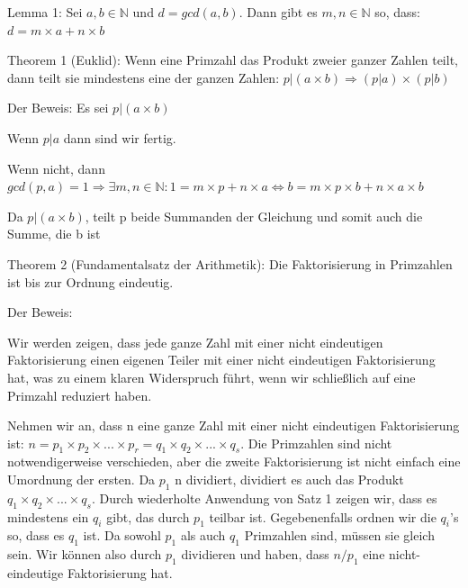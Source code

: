 \documentclass[a4paper]{article}
\begin{document}
\begin{multicols}{3}
\begin{itemize*}
\begin{itemize*}
                  \item Lemma 1: Sei $a,b\in\mathbb{N}$ und $d=gcd(a,b)$. Dann gibt es $m,n\in\mathbb{N}$ so, dass: $d=m\times a+n \times b$
            \end{itemize*}
            \item Theorem 1 (Euklid): Wenn eine Primzahl das Produkt zweier ganzer
            Zahlen teilt, dann teilt sie mindestens eine der ganzen Zahlen:
            $p|(a\times b)\Rightarrow (p| a)\times(p| b)$
            \begin{itemize*}
                  \item Der Beweis: Es sei $p|(a\times b)$
                  \begin{itemize*}
                        \item Wenn $p| a$ dann sind wir fertig.
                        \item Wenn nicht, dann $gcd(p,a) = 1 \Rightarrow\exists m, n\in\mathbb{N}:1=m\times p+n\times a \Leftrightarrow b=m\times p \times b + n \times a \times b$
                        \item Da $p|(a\times b)$, teilt p beide Summanden der Gleichung und somit auch die Summe, die b ist
                  \end{itemize*}
            \end{itemize*}
            \item Theorem 2 (Fundamentalsatz der Arithmetik): Die Faktorisierung in Primzahlen ist bis zur Ordnung eindeutig.
            \begin{itemize*}
                  \item Der Beweis:
                  \begin{itemize*}
                        \item Wir werden zeigen, dass jede ganze Zahl mit einer nicht eindeutigen Faktorisierung einen eigenen Teiler mit einer nicht eindeutigen Faktorisierung hat, was zu einem klaren Widerspruch führt, wenn wir schließlich auf eine Primzahl reduziert haben.
                        \item Nehmen wir an, dass n eine ganze Zahl mit einer nicht eindeutigen Faktorisierung ist: $n=p_1\times p_2\times ...\times p_r=q_1 \times q_2\times ... \times q_s$. Die Primzahlen sind nicht notwendigerweise verschieden, aber die zweite Faktorisierung ist nicht einfach eine Umordnung der ersten. Da $p_1$ n dividiert, dividiert es auch das Produkt $q_1\times q_2\times ... \times q_s$. Durch wiederholte Anwendung von Satz 1 zeigen wir, dass es mindestens ein $q_i$ gibt, das durch $p_1$ teilbar ist. Gegebenenfalls ordnen wir die $q_i$'s so, dass es $q_1$ ist. Da sowohl $p_1$ als auch $q_1$ Primzahlen sind, müssen sie gleich sein. Wir können also durch $p_1$ dividieren und haben, dass $n/p_1$ eine nicht-eindeutige Faktorisierung hat.

\end{itemize*}
\end{itemize*}
\end{itemize*}
\end{multicols}
\end{document}
